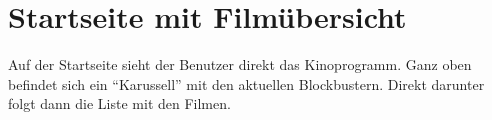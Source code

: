 \section{Startseite mit Filmübersicht}

Auf der Startseite sieht der Benutzer direkt das Kinoprogramm.
Ganz oben befindet sich ein \enquote{Karussell} mit den aktuellen Blockbustern.
Direkt darunter folgt dann die Liste mit den Filmen.

\begin{figure}[ht]
	\centering
	\hfill
\end{figure}
